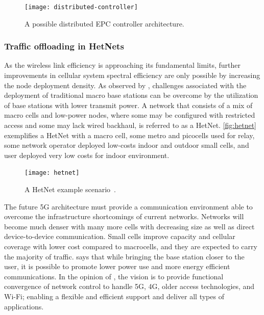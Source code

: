 \begin{figure}[htb]
  \centering
  \texttt{[image: distributed-controller]}
  \caption{A possible distributed \acs{EPC} controller architecture.}
  \label{fig:distributed-controller}
\end{figure}

\subsubsection{Traffic offloading in \acsp{HetNet}}
\label{subsec:heterogeneous}

As the wireless link efficiency is approaching its fundamental limits, further
improvements in cellular system spectral efficiency are only possible by
increasing the node deployment density. As observed by \citet{Damnjanovic2011},
challenges associated with the deployment of traditional macro base stations
can be overcome by the utilization of base stations with lower transmit power.
A network that consists of a mix of macro cells and low-power nodes, where some
may be configured with restricted access and some may lack wired backhaul, is
referred to as a \acf{HetNet}. \autoref{fig:hetnet} exemplifies a \ac{HetNet}
with a macro cell, some metro and picocells used for relay, some network
operator deployed low-costs indoor and outdoor small cells, and user deployed
very low costs for indoor environment.

\begin{figure}[htb]
  \centering
  \texttt{[image: hetnet]}
  \caption{A \acs{HetNet} example scenario~\cite{Qualcomm2014}.}
  \label{fig:hetnet}
\end{figure}

The future 5G architecture must provide a communication environment able to
overcome the infrastructure shortcomings of current networks. Networks will
become much denser with many more cells with decreasing size as well as direct
device-to-device communication. Small cells improve capacity and cellular
coverage with lower cost compared to macrocells, and they are expected to carry
the majority of traffic. \citet{Pierucci2015} says that while bringing the base
station closer to the user, it is possible to promote lower power use and more
energy efficient communications. In the opinion of \citet{Einsiedler2015}, the
vision is to provide functional convergence of network control to handle 5G,
4G, older access technologies, and Wi-Fi; enabling a flexible and efficient
support and deliver all types of applications.

